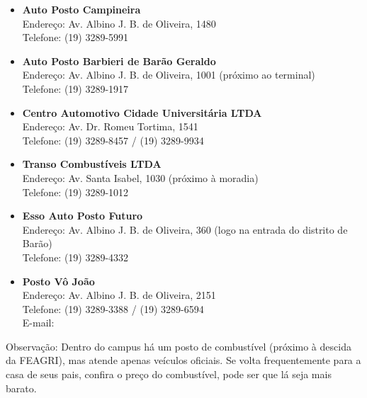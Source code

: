 \begin{itemize}
    \item \textbf{Auto Posto Campineira}
        \\Endereço: Av. Albino J. B. de Oliveira, 1480
        \\Telefone: (19) 3289-5991

    \item \textbf{Auto Posto Barbieri de Barão Geraldo}
        \\Endereço: Av. Albino J. B. de Oliveira, 1001 (próximo ao terminal)
        \\Telefone: (19) 3289-1917

    \item \textbf{Centro Automotivo Cidade Universitária LTDA}
        \\Endereço: Av. Dr. Romeu Tortima, 1541
        \\Telefone: (19) 3289-8457 / (19) 3289-9934

    \item \textbf{Transo Combustíveis LTDA}
        \\Endereço: Av. Santa Isabel, 1030 (próximo à moradia)
        \\Telefone: (19) 3289-1012

    \item \textbf{Esso Auto Posto Futuro}
        \\Endereço: Av. Albino J. B. de Oliveira, 360 (logo na entrada do
        distrito de Barão)
        \\Telefone: (19) 3289-4332

    \item \textbf{Posto Vô João}
        \\Endereço: Av. Albino J. B. de Oliveira, 2151
        \\Telefone: (19) 3289-3388 / (19) 3289-6594
        \\E-mail: 
\end{itemize}


Observação: Dentro do campus há um posto de combustível (próximo à descida da
FEAGRI), mas atende apenas veículos oficiais. Se volta frequentemente para a
casa de seus pais, confira o preço do combustível, pode ser que lá seja mais
barato.
